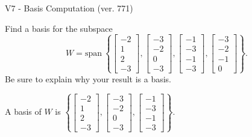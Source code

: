 \begin{exercise}
  \begin{exerciseTitle}V7 - Basis Computation (ver. 771)\end{exerciseTitle}
  \begin{exerciseStatement}
    Find a basis for the subspace 
\[W=\mathrm{span}\ \left\{\left[\begin{array}{r}
-2 \\
1 \\
2 \\
-3
\end{array}\right] , \left[\begin{array}{r}
-3 \\
-2 \\
0 \\
-3
\end{array}\right] , \left[\begin{array}{r}
-1 \\
-3 \\
-1 \\
-3
\end{array}\right] , \left[\begin{array}{r}
-3 \\
-2 \\
-1 \\
0
\end{array}\right]\right\}.\]
 Be sure to explain why your result is a basis.


  \end{exerciseStatement}
  \begin{exerciseAnswer}
   A basis of \(W\) is  \(\left\{\left[\begin{array}{r}
-2 \\
1 \\
2 \\
-3
\end{array}\right] , \left[\begin{array}{r}
-3 \\
-2 \\
0 \\
-3
\end{array}\right] , \left[\begin{array}{r}
-1 \\
-3 \\
-1 \\
-3
\end{array}\right]\right\}\).
  


  \end{exerciseAnswer}
\end{exercise}